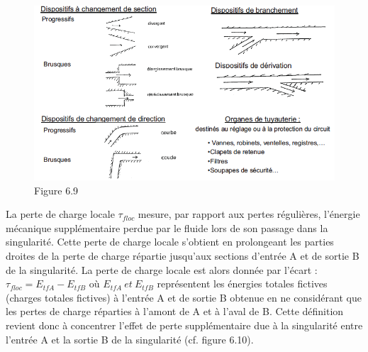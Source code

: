 \begin{figure}[h]
\begin{center}
\includegraphics[scale=0.45]{ch6/70.png}
\caption*{Figure 6.9}
\end{center}
\end{figure}

La perte de charge locale $\tau_{floc}$ mesure, par rapport aux pertes régulières, l’énergie mécanique supplémentaire perdue par le fluide lors de son passage dans la singularité. Cette perte de charge locale s’obtient en prolongeant les parties droites de la perte de charge répartie jusqu'aux sections d'entrée A et de sortie B de la singularité. La perte de charge locale est alors donnée par l'écart : $\tau_{floc}=E_{tfA}-E_{tfB}$ où  $E_{tfA} \ et \ E_{tfB}$ représentent les énergies totales fictives (charges totales fictives) à l’entrée A et de sortie B obtenue en ne considérant que les pertes
de charge réparties à l’amont de A et à l’aval de B. Cette définition revient donc à concentrer l’effet de perte supplémentaire due à la singularité entre l’entrée A et la sortie B de la singularité (cf. figure 6.10).

